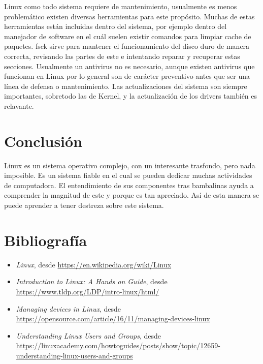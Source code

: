 \documentclass[11pt,letterpaper]{article} 	%
\begin{document}
Linux como todo sistema requiere de mantenimiento, usualmente es menos problemático existen diversas herramientas para este propósito. Muchas de estas herramientas están incluidas dentro del sistema, por ejemplo dentro del manejador de software en el cuál suelen existir comandos para limpiar cache de paquetes. fsck sirve para mantener el funcionamiento del disco duro de manera correcta, revisando las partes de este e intentando reparar y recuperar estas secciones. Usualmente un antivirus no es necesario, aunque existen antivirus que funcionan en Linux por lo general son de carácter preventivo antes que ser una línea de defensa o mantenimiento. Las actualizaciones del sistema son siempre importantes, sobretodo las de Kernel, y la actualización de los drivers también es relavante.

\section*{Conclusión}
Linux es un sistema operativo complejo, con un interesante trasfondo, pero nada imposible. Es un sistema fiable en el cual se pueden dedicar muchas actividades de computadora. El entendimiento de sus componentes tras bambalinas ayuda a comprender la magnitud de este y porque es tan apreciado. Así de esta manera se puede aprender a tener destreza sobre este sistema.

\section*{Bibliografía}
\begin{itemize}
	\item \textit{Linux}, desde \url{https://en.wikipedia.org/wiki/Linux}
	\item \textit{Introduction to Linux: A Hands on Guide}, desde \url{https://www.tldp.org/LDP/intro-linux/html/}
	\item \textit{Managing devices in Linux}, desde \url{https://opensource.com/article/16/11/managing-devices-linux}
	\item \textit{Understanding Linux Users and Groups}, desde \url{https://linuxacademy.com/howtoguides/posts/show/topic/12659-understanding-linux-users-and-groups}
\end{itemize}
\end{document}

